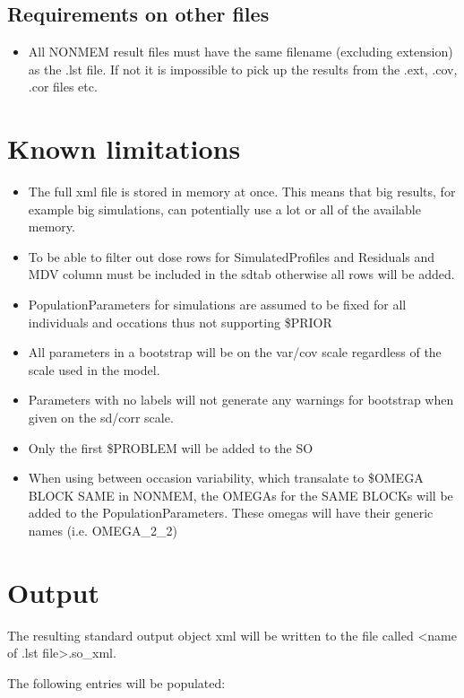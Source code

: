 \subsection{Requirements on other files}
\begin{itemize}
    \item All NONMEM	 result files must have the same filename (excluding extension) as the .lst file. If not it is impossible to pick up the results from the .ext, .cov, .cor files etc.
\end{itemize}

\section{Known limitations}
\begin{itemize}
    \item The full xml file is stored in memory at once. This means that big results, for example big simulations, can potentially use a lot or all of the available memory.
    \item To be able to filter out dose rows for SimulatedProfiles and Residuals and MDV column must be included in the sdtab otherwise all rows will be added.
    \item PopulationParameters for simulations are assumed to be fixed for all individuals and occations thus not supporting \$PRIOR
    \item All parameters in a bootstrap will be on the var/cov scale regardless of the scale used in the model.
    \item Parameters with no labels will not generate any warnings for bootstrap when given on the sd/corr scale.
    \item Only the first \$PROBLEM will be added to the SO
    \item When using between occasion variability, which transalate to \$OMEGA BLOCK SAME in NONMEM, the OMEGAs for the SAME BLOCKs will be added to the PopulationParameters. These omegas will have their generic names (i.e. OMEGA\_2\_2)
\end{itemize}

\section{Output}

The resulting standard output object xml will be written to the file called <name of .lst file>.so\_xml.

The following entries will be populated:

